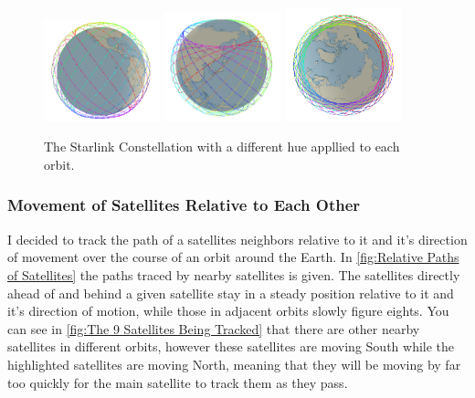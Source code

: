 \documentclass[12pt]{article}
\begin{document}
\begin{figure}
\label{fig:Structure of Network}
\caption{The Starlink Constellation with a different hue appllied to each orbit.}
\includegraphics[width=0.3\textwidth]{Hue1}
\includegraphics[width=0.3\textwidth]{Hue2}
\includegraphics[width=0.3\textwidth]{Hue3}
\end{figure}


\subsubsection{Movement of Satellites Relative to Each Other}

I decided to track the path of a satellites neighbors relative to it and it's direction of movement over the course of an orbit around the Earth. In \ref{fig:Relative Paths of Satellites} the paths traced by nearby satellites is given. The satellites directly ahead of and behind a given satellite stay in a steady position relative to it and it's direction of motion, while those in adjacent orbits slowly figure eights. You can see in \ref{fig:The 9 Satellites Being Tracked} that there are other nearby satellites in different orbits, however these satellites are moving South while the highlighted satellites are moving North, meaning that they will be moving by far too quickly for the main satellite to track them as they pass. \cite{OriginalReport}
\end{document}
